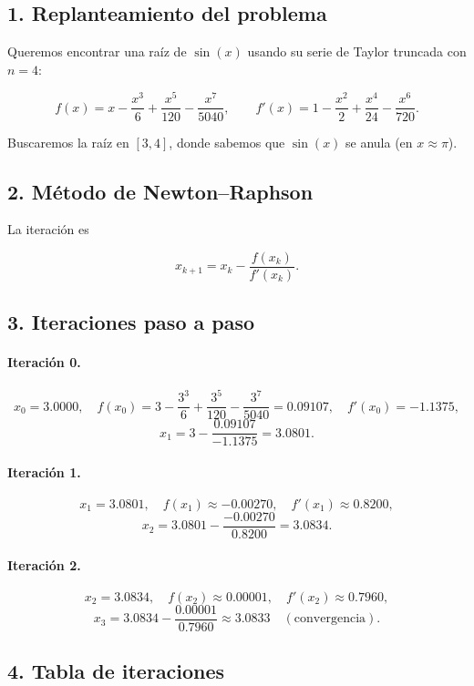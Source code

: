 \documentclass[12pt]{article}
\begin{document}
\subsection*{1. Replanteamiento del problema}

Queremos encontrar una raíz de \(\sin(x)\) usando su serie de Taylor truncada con \(n=4\):

\[
f(x) = x - \frac{x^3}{6} + \frac{x^5}{120} - \frac{x^7}{5040},
\qquad
f'(x) = 1 - \frac{x^2}{2} + \frac{x^4}{24} - \frac{x^6}{720}.
\]

Buscaremos la raíz en \([3,4]\), donde sabemos que \(\sin(x)\) se anula (en \(x\approx\pi\)).

\subsection*{2. Método de Newton–Raphson}

La iteración es

\[
x_{k+1} = x_k - \frac{f(x_k)}{f'(x_k)}.
\]

\subsection*{3. Iteraciones paso a paso}

\paragraph{Iteración 0.}
\[
x_0 = 3.0000,\quad
f(x_0)=3 - \frac{3^3}{6} + \frac{3^5}{120} - \frac{3^7}{5040}
=0.09107,\quad
f'(x_0)=-1.1375,
\]
\[
x_1 = 3 - \frac{0.09107}{-1.1375} = 3.0801.
\]

\paragraph{Iteración 1.}
\[
x_1 = 3.0801,\quad
f(x_1)\approx -0.00270,\quad
f'(x_1)\approx 0.8200,
\]
\[
x_2 = 3.0801 - \frac{-0.00270}{0.8200} = 3.0834.
\]

\paragraph{Iteración 2.}
\[
x_2 = 3.0834,\quad
f(x_2)\approx 0.00001,\quad
f'(x_2)\approx 0.7960,
\]
\[
x_3 = 3.0834 - \frac{0.00001}{0.7960} \approx 3.0833\quad(\text{convergencia}).
\]

\subsection*{4. Tabla de iteraciones}
\end{document}
